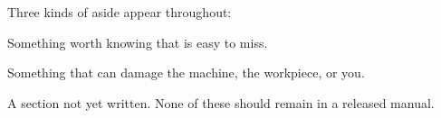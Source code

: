 Three kinds of aside appear throughout:

\begin{wbnote}
Something worth knowing that is easy to miss.
\end{wbnote}

\begin{wbwarning}
Something that can damage the machine, the workpiece, or you.
\end{wbwarning}

\begin{wbtodo}
A section not yet written. None of these should remain in a released manual.
\end{wbtodo}
